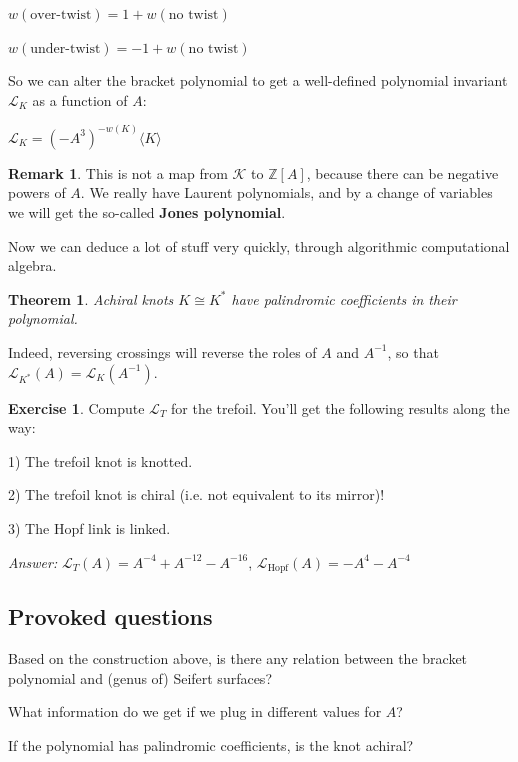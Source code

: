 \documentclass[11pt]{article}
\newcommand{\Z}{\mathbb{Z}}
\theoremstyle{plain}
\newtheorem{thm}{Theorem}
\theoremstyle{definition}
\newtheorem{remark}{Remark}
\newtheorem{exercise}{Exercise}
\begin{document}
$w(\text{over-twist})=1+w(\text{no twist})$

$w(\text{under-twist})=-1+w(\text{no twist})$

\noindent
So we can alter the bracket polynomial to get a well-defined polynomial invariant $\mathcal{L}_K$ as a function of $A$:
\begin{center}
$\mathcal{L}_K=(-A^3)^{-w(K)}\langle K\rangle$
\end{center}

\begin{remark}
This is not a map from $\mathcal{K}$ to $\Z[A]$, because there can be negative powers of $A$. We really have Laurent polynomials, and by a change of variables we will get the so-called \textbf{Jones polynomial}.
\end{remark}

Now we can deduce a lot of stuff very quickly, through algorithmic computational algebra.

\begin{thm}
Achiral knots $K\cong K^\ast$ have palindromic coefficients in their polynomial.
\end{thm}

Indeed, reversing crossings will reverse the roles of $A$ and $A^{-1}$, so that $\mathcal{L}_{K^\ast}(A)=\mathcal{L}_K(A^{-1})$.

\begin{exercise}
Compute $\mathcal{L}_T$ for the trefoil. You'll get the following results along the way:

1) The trefoil knot is knotted.

2) The trefoil knot is chiral (i.e. not equivalent to its mirror)!

3) The Hopf link is linked.

\textit{Answer:} $\mathcal{L}_T(A)=A^{-4}+A^{-12}-A^{-16}$, $\mathcal{L}_\text{Hopf}(A)=-A^4-A^{-4}$
\end{exercise}


\subsection{Provoked questions}
\indent\indent
Based on the construction above, is there any relation between the bracket polynomial and (genus of) Seifert surfaces?

\bigskip
What information do we get if we plug in different values for $A$?

\bigskip
If the polynomial has palindromic coefficients, is the knot achiral?
\end{document}
